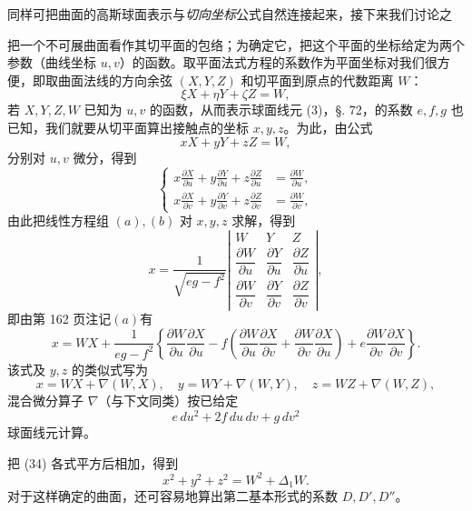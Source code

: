 同样可把曲面的高斯球面表示与\emph{切向坐标}公式自然连接起来，接下来我们讨论之

把一个不可展曲面看作其切平面的包络；为确定它，把这个平面的坐标给定为两个参数（曲线坐标 \(u,v\)）的函数。取平面法式方程的系数作为平面坐标对我们很方便，即取曲面法线的方向余弦 \((X,Y,Z)\) 和切平面到原点的代数距离 \(W\)：
\[
 \xi X+\eta Y+\zeta Z=W,
\]
若 \(X,Y,Z,W\) 已知为 \(u,v\) 的函数，从而表示球面线元 (3)，\S. 72，的系数 \(e,f,g\) 也已知，我们就要从切平面算出接触点的坐标 \(x,y,z\)。为此，由公式
\begin{equation}\tag{a}
 xX+yY+zZ=W,
\end{equation}
分别对 \(u,v\) 微分，得到
\begin{equation}\tag{b}
\left\{\begin{aligned}
 x\frac{\partial X}{\partial u}+y\frac{\partial Y}{\partial u}+z\frac{\partial Z}{\partial u}&=\frac{\partial W}{\partial u},\\
 x\frac{\partial X}{\partial v}+y\frac{\partial Y}{\partial v}+z\frac{\partial Z}{\partial v}&=\frac{\partial W}{\partial v},
\end{aligned}\right.
\end{equation}
由此把线性方程组 \((a),(b)\) 对 \(x,y,z\) 求解，得到
\[
 x=\frac{1}{\sqrt{eg-f^2}}
 \left|\begin{matrix}
 W&Y&Z\\[0.25em]
 \dfrac{\partial W}{\partial u}&\dfrac{\partial Y}{\partial u}&\dfrac{\partial Z}{\partial u}\\[0.65em]
 \dfrac{\partial W}{\partial v}&\dfrac{\partial Y}{\partial v}&\dfrac{\partial Z}{\partial v}
 \end{matrix}\right|,
\]
即由第 162 页注记\((a)\)有
\[
 x=WX+\frac{1}{eg-f^2}\left\{\frac{\partial W}{\partial u}\frac{\partial X}{\partial u}
 -f\left(\frac{\partial W}{\partial u}\frac{\partial X}{\partial v}+\frac{\partial W}{\partial v}\frac{\partial X}{\partial u}\right)
 +e\frac{\partial W}{\partial v}\frac{\partial X}{\partial v}\right\}.
\]
该式及 \(y,z\) 的类似式写为
\begin{equation}\tag{34}
 x=WX+\nabla(W,X),\quad y=WY+\nabla(W,Y),\quad z=WZ+\nabla(W,Z),
\end{equation}
混合微分算子 \(\nabla\)（与下文同类）按已给定
\[
 e\,du^2+2f\,du\,dv+g\,dv^2
\]
球面线元计算。

把 (34) 各式平方后相加，得到
\begin{equation}\tag{34*}
 x^2+y^2+z^2=W^2+\Delta_1 W.
\end{equation}
对于这样确定的曲面，还可容易地算出第二基本形式的系数 \(D,D',D''\)。

